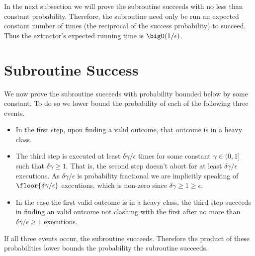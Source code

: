 In the next subsection we will prove the subroutine succeeds with no less than constant probability.
Therefore, the subroutine need only be run an expected constant number of times (the reciprocal of the success probability) to succeed.
Thus the extractor's expected running time is $\bigO(1/\epsilon)$.


\section{Subroutine Success}

We now prove the subroutine succeeds with probability bounded below by some constant.
To do so we lower bound the probability of each of the following three events.
\begin{itemize}
    \item
    In the first step, upon finding a valid outcome, that outcome is in a heavy class.

    \item
    The third step is executed at least $\delta\gamma/\epsilon$ times for some constant $\gamma\in(0,1]$ such that $\delta\gamma\geq1$.
    That is, the second step doesn't abort for at least $\delta\gamma/\epsilon$ executions.
    As $\delta\gamma/\epsilon$ is probability fractional we are implicitly speaking of $\floor{\delta\gamma/\epsilon}$ executions, which is non-zero since $\delta\gamma\geq1\geq\epsilon$.

    \item
    In the case the first valid outcome is in a heavy class, the third step succeeds in finding an valid outcome not clashing with the first after no more than $\delta\gamma/\epsilon\geq1$ executions.
\end{itemize}
If all three events occur, the subroutine succeeds.
Therefore the product of these probabilities lower bounds the probability the subroutine succeeds.

